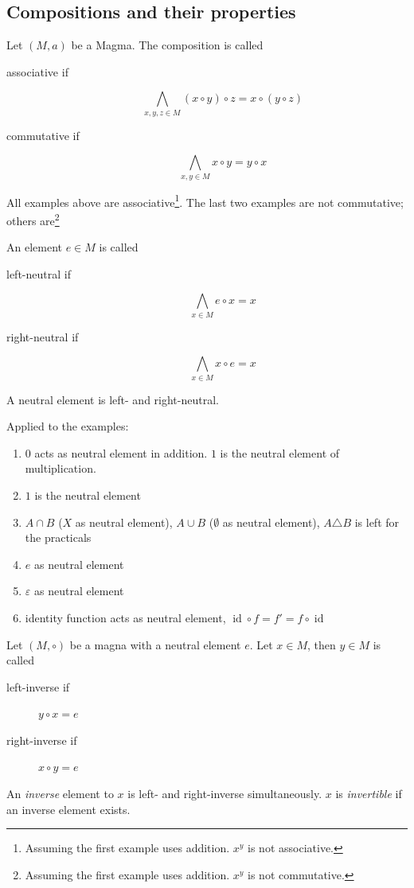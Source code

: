 \documentclass[a4paper,landscape,twocolumn]{article}
\begin{document}
\subsection{Compositions and their properties}

Let $(M, a)$ be a Magma. The composition is called

\begin{description}
  \item[associative if]
    \[ \bigwedge_{x,y,z \in M} (x \circ y) \circ z = x \circ (y \circ z) \]
  \item[commutative if]
    \[ \bigwedge_{x,y \in M} x \circ y = y \circ x \]
\end{description}

All examples above are associative\footnote{Assuming the first example uses addition. $x^y$ is not associative.}.
The last two examples are not commutative; others are\footnote{Assuming the first example uses addition. $x^y$ is not commutative.}

An element $e \in M$ is called
\begin{description}
  \item[left-neutral if] \[ \bigwedge_{x \in M} e \circ x = x \]
  \item[right-neutral if] \[ \bigwedge_{x \in M} x \circ e = x \]
\end{description}
A neutral element is left- and right-neutral.

Applied to the examples:
\begin{enumerate}
  \item $0$ acts as neutral element in addition. $1$ is the neutral element of multiplication.
  \item $1$ is the neutral element
  \item $A \cap B$ ($X$ as neutral element), $A \cup B$ ($\emptyset$ as neutral element), $A \triangle B$ is left for the practicals
  \item $e$ as neutral element
  \item $\varepsilon$ as neutral element
  \item identity function acts as neutral element, $\operatorname{id} \circ f = f' = f \circ \operatorname{id}$
\end{enumerate}

Let $(M, \circ)$ be a magna with a neutral element $e$.
Let $x \in M$, then $y \in M$ is called
\begin{description}
  \item[left-inverse if] $y \circ x = e$
  \item[right-inverse if] $x \circ y = e$
\end{description}
An \emph{inverse} element to $x$ is left- and right-inverse simultaneously.
$x$ is \emph{invertible} if an inverse element exists.
\end{document}
